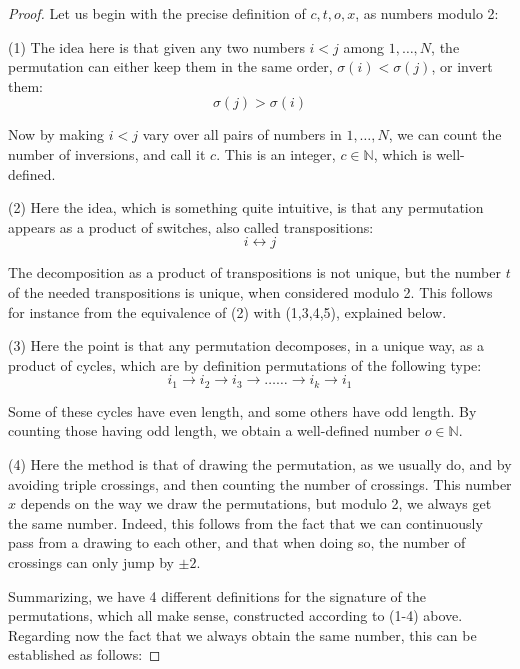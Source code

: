 \documentclass[12pt]{amsbook}
\begin{document}
\begin{proof}
Let us begin with the precise definition of $c,t,o,x$, as numbers modulo 2:

\medskip

(1) The idea here is that given any two numbers $i<j$ among $1,\ldots,N$, the permutation  can either keep them in the same order, $\sigma(i)<\sigma(j)$, or invert them:
$$\sigma(j)>\sigma(i)$$

Now by making $i<j$ vary over all pairs of numbers in $1,\ldots,N$, we can count the number of inversions, and call it $c$. This is an integer, $c\in\mathbb N$, which is well-defined.

\medskip

(2) Here the idea, which is something quite intuitive, is that any permutation appears as a product of switches, also called transpositions: 
$$i\leftrightarrow j$$

The decomposition as a product of transpositions is not unique, but the number $t$ of the needed transpositions is unique, when considered modulo 2. This follows for instance from the equivalence of (2) with (1,3,4,5), explained below.

\medskip

(3) Here the point is that any permutation decomposes, in a unique way, as a product of cycles, which are by definition permutations of the following type:
$$i_1\to i_2\to i_3\to\ldots\ldots\to i_k\to i_1$$

Some of these cycles have even length, and some others have odd length. By counting those having odd length, we obtain a well-defined number $o\in\mathbb N$.

\medskip

(4) Here the method is that of drawing the permutation, as we usually do, and by avoiding triple crossings, and then counting the number of crossings. This number $x$ depends on the way we draw the permutations, but modulo 2, we always get the same number. Indeed, this follows from the fact that we can continuously pass from a drawing to each other, and that when doing so, the number of crossings can only jump by $\pm2$.

\medskip

Summarizing, we have 4 different definitions for the signature of the permutations, which all make sense, constructed according to (1-4) above. Regarding now the fact that we always obtain the same number, this can be established as follows:

\medskip


\end{proof}
\end{document}
